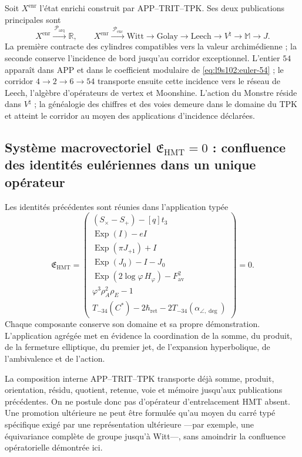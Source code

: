 Soit \(X^{\mathrm{enr}}\) l'état enrichi construit par
APP--TRIT--TPK. Ses deux publications principales sont
\begin{equation}
 X^{\mathrm{enr}}
 \xrightarrow{\ \mathcal P_{\mathrm{arq}}\ }\mathbb R,
 \qquad
 X^{\mathrm{enr}}
 \xrightarrow{\ \mathcal P_{\mathrm{exc}}\ }
 \mathrm{Witt}\to\mathrm{Golay}\to\mathrm{Leech}
 \to V^\natural\to\mathbb M\to J.
 \label{eq:l9s102:euler-doble-proyeccion}
\end{equation}
La première contracte des cylindres compatibles vers la valeur archimédienne ; la
seconde conserve l'incidence de bord jusqu'au corridor exceptionnel.
L'entier \(54\) apparaît dans APP et dans le coefficient modulaire de
\cref{eq:l9s102:euler-54} ; le corridor \(4\to2\to6\to54\) transporte
ensuite cette incidence vers le réseau de Leech, l'algèbre d'opérateurs
de vertex et Moonshine. L'action du Monstre réside dans
\(V^\natural\) ; la généalogie des chiffres et des voies demeure dans le domaine
du TPK et atteint le corridor au moyen des applications d'incidence déclarées.

\subsection{Système macrovectoriel \texorpdfstring{\(\mathfrak E_{\mathrm{HMT}}=0\)}{E_HMT=0} : confluence des identités eulériennes dans un unique opérateur}
\label{sec:l9s102:euler-macrovector}

Les identités précédentes sont réunies dans l'application typée
\begin{equation}
 \boxed{
 \mathfrak E_{\mathrm{HMT}}=
 \begin{pmatrix}
 (S_\times-S_+)-[q]t_3\\[1mm]
 \operatorname{Exp}(I)-eI\\
 \operatorname{Exp}(\pi J_{+1})+I\\
 \operatorname{Exp}(J_0)-I-J_0\\
 \operatorname{Exp}(2\log\varphi\,H_\varphi)-F_{\mathrm{av}}^2\\
 \varphi^3\rho_A^2\rho_E-1\\
 T_{-34}(C^*)-2\hbar_{\mathrm{ret}}
 -2T_{-34}(\alpha_{\angle,\deg})
 \end{pmatrix}=0.}
 \label{eq:l9s102:euler-macrovector}
\end{equation}
Chaque composante conserve son domaine et sa propre démonstration. L'application
agrégée met en évidence la coordination de la somme, du produit, de la fermeture elliptique, du premier
jet, de l'expansion hyperbolique, de l'ambivalence et de l'action.

La composition interne APP--TRIT--TPK transporte déjà somme, produit,
orientation, résidu, quotient, retenue, voie et mémoire jusqu'aux
publications précédentes. On ne postule donc pas d'opérateur d'entrelacement HMT
absent. Une promotion ultérieure ne peut être formulée qu'au moyen du carré
typé spécifique exigé par une représentation ultérieure ---par exemple,
une équivariance complète de groupe jusqu'à Witt---, sans amoindrir la confluence
opératorielle démontrée ici.
